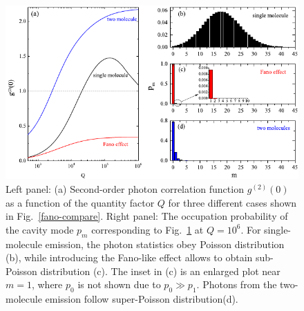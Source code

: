 \documentclass[aps,prb,
,floatfix,footinbib,longbibliography,
preprint
]{revtex4-1}
\begin{document}
\begin{figure}[h]
\centering
\includegraphics[width=12cm]{fano-rp-mix01.pdf}
\caption{Left panel: (a) Second-order photon correlation function $g^{(2)}(0)$ as a function of the quantity factor $Q$ for three different cases shown in Fig.~\ref{fano-compare}. Right panel: The occupation probability of the cavity mode $p_{m}$ corresponding to Fig.~\ref{fano-rp} at $Q=10^{6}$.
For single-molecule emission, the photon statistics obey Poisson distribution (b), while introducing the Fano-like effect allows to obtain sub-Poisson distribution (c). The inset in (c) is an enlarged plot near $m=1$, where $p_{0}$ is not shown due to $p_{0}\gg p_{1}$. Photons  from the two-molecule emission follow super-Poisson distribution(d).}
\label{fano-rp}
\end{figure}
\end{document}

